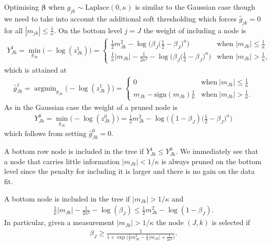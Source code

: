 \documentclass[11pt,a4paper]{article}
\DeclareMathOperator*{\argmin}{argmin}
\begin{document}
Optimising $\boldsymbol{\beta}$ when $g_{jk}\sim \text{Laplace}(0,\kappa)$ is similar to the Gaussian case though we need to take into account the additional soft thresholding which forces $\hat{g}_{jk}=0$ for all $|m_{jk}|\leq\frac{1}{\kappa}$. On the bottom level $j=J$ the weight of including a node is 
\begin{align*}
Y^1_{Jk} 
= \min_{g_{Jk}}\big(-\log(z^1_{Jk})\big)
=\begin{cases}
\frac{1}{2}m_{Jk}^2 -\log\Big(\beta_J\big(\frac{1}{2}-\beta_J\big)^a\Big) 
& \text{when } |m_{Jk}|\leq \frac{1}{\kappa} \\
\frac{1}{\kappa}|m_{Jk}|-\frac{1}{2\kappa^2}
-\log\Big(\beta_J\big(\frac{1}{2}-\beta_J\big)^a\Big)  
& \text{when } |m_{Jk}|> \frac{1}{\kappa},
\end{cases}
\end{align*}
which is attained at 
\begin{align*}
\hat{g}^1_{Jk}=
\argmin_{g_{Jk}}\big(-\log(z^1_{Jk})\big)
=\begin{cases}
      0 & \text{when}\ |m_{Jk}|\leq \frac{1}{\kappa} \\
     m_{Jk}-\text{sign}(m_{Jk})\frac{1}{\kappa} & \text{when}\ |m_{Jk}|> \frac{1}{\kappa}.
 \end{cases}
\end{align*}
As in the Gaussian case the weight of a pruned node is 
\begin{align*}
Y^0_{Jk} 
= \min_{g_{Jk}}\big(-\log(z^0_{Jk})\big)
=\frac{1}{2}m_{Jk}^2 -\log\Big((1-\beta_J)\big(\frac{1}{2}-\beta_J\big)^a\Big)
\end{align*}
which follows from setting $\hat{g}^0_{Jk}=0$.

A bottom row node is included in the tree if $Y^1_{Jk}\leq Y^0_{Jk}$. We immediately see that a node that carries little information $|m_{Jk}|<1/\kappa$ is always pruned on the bottom level since the penalty for including it is larger and there is no gain on the data fit. 

A bottom node is included in the tree if $|m_{Jk}|>1/\kappa$ and 
\begin{align}
\frac{1}{\kappa}|m_{Jk}|-\frac{1}{2\kappa^2}-\log(\beta_J)
\leq \frac{1}{2}m^2_{Jk}-\log(1-\beta_J).
\end{align}
In particular, given a measurement $|m_{Jk}|>1/\kappa$ the node $(J,k)$ is selected if 
\begin{align*}
\beta_J\geq\frac{1}{1+\exp\big(\frac{1}{2}m^2_{Jk}-\frac{1}{\kappa}|m_{Jk}|+\frac{1}{2\kappa^2}\big)}.    
\end{align*}
\end{document}
